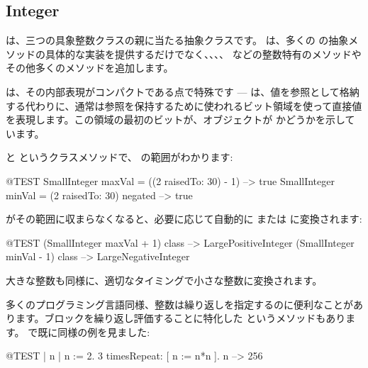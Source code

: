 \documentclass[a4paper,10pt,twoside]{book}
\begin{document}

\subsection{Integer}

 は、三つの具象整数クラスの親に当たる抽象クラスです。 は、多くの  の抽象メソッドの具体的な実装を提供するだけでなく、、、、 などの整数特有のメソッドやその他多くのメソッドを追加します。

 は、その内部表現がコンパクトである点で特殊です ---  は、値を参照として格納する代わりに、通常は参照を保持するために使われるビット領域を使って直接値を表現します。この領域の最初のビットが、オブジェクトが  かどうかを示しています。%

 と  というクラスメソッドで、 の範囲がわかります:

\begin{code}{@TEST}
SmallInteger maxVal = ((2 raisedTo: 30) - 1)      --> true
SmallInteger minVal = (2 raisedTo: 30) negated --> true
\end{code}

 がその範囲に収まらなくなると、必要に応じて自動的に  または  に変換されます:

\begin{code}{@TEST}
(SmallInteger maxVal + 1) class --> LargePositiveInteger
(SmallInteger minVal - 1) class  --> LargeNegativeInteger
\end{code}

大きな整数も同様に、適切なタイミングで小さな整数に変換されます。%

多くのプログラミング言語同様、整数は繰り返しを指定するのに便利なことがあります。ブロックを繰り返し評価することに特化した  というメソッドもあります。%
で既に同様の例を見ました:%
\begin{code}{@TEST | n |}
n := 2.
3 timesRepeat: [ n := n*n ].
n --> 256
\end{code}
\end{document}
